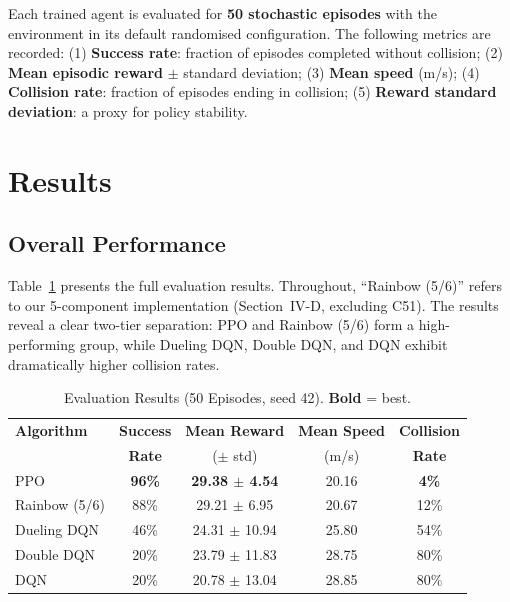 \documentclass[conference]{IEEEtran}
\begin{document}
Each trained agent is evaluated for \textbf{50 stochastic episodes} with the environment
in its default randomised configuration. The following metrics are recorded:
(1) \textbf{Success rate}: fraction of episodes completed without collision;
(2) \textbf{Mean episodic reward} $\pm$ standard deviation;
(3) \textbf{Mean speed} (m/s);
(4) \textbf{Collision rate}: fraction of episodes ending in collision;
(5) \textbf{Reward standard deviation}: a proxy for policy stability.

\section{Results}

\subsection{Overall Performance}

Table~\ref{tab:results} presents the full evaluation results.
Throughout, ``Rainbow (5/6)'' refers to our 5-component implementation
(Section~IV-D, excluding C51). The results reveal a clear
two-tier separation: PPO and Rainbow (5/6) form a high-performing group, while
Dueling DQN, Double DQN, and DQN exhibit dramatically higher collision rates.

\begin{table}[htbp]
\centering
\caption{Evaluation Results (50 Episodes, seed 42). \textbf{Bold} = best.}
\label{tab:results}
\begin{tabular}{@{}lcccc@{}}
\toprule
\textbf{Algorithm} & \textbf{Success} & \textbf{Mean Reward} & \textbf{Mean Speed} & \textbf{Collision} \\
                   & \textbf{Rate}    & ($\pm$ std)          & (m/s)               & \textbf{Rate} \\ \midrule
PPO                & \textbf{96\%}    & \textbf{29.38 $\pm$ 4.54}  & 20.16 & \textbf{4\%}  \\
Rainbow (5/6)      & 88\%             & 29.21 $\pm$ 6.95     & 20.67               & 12\%  \\
Dueling DQN        & 46\%             & 24.31 $\pm$ 10.94    & 25.80               & 54\%  \\
Double DQN         & 20\%             & 23.79 $\pm$ 11.83    & 28.75               & 80\%  \\
DQN                & 20\%             & 20.78 $\pm$ 13.04    & 28.85               & 80\%  \\ \bottomrule
\end{tabular}
\end{table}
\end{document}
